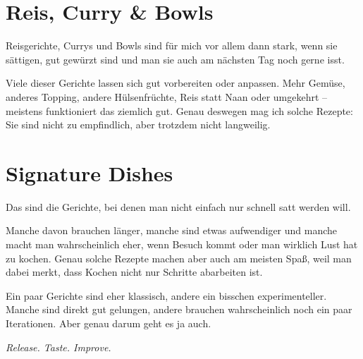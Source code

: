 \documentclass[
a4paper,
11pt
]{article}
\begin{document}

\section{Reis, Curry \& Bowls}

Reisgerichte, Currys und Bowls sind für mich vor allem dann stark, wenn sie sättigen, gut gewürzt sind und man sie auch am nächsten Tag noch gerne isst.

Viele dieser Gerichte lassen sich gut vorbereiten oder anpassen. Mehr Gemüse, anderes Topping, andere Hülsenfrüchte, Reis statt Naan oder umgekehrt -- meistens funktioniert das ziemlich gut. Genau deswegen mag ich solche Rezepte: Sie sind nicht zu empfindlich, aber trotzdem nicht langweilig.

\mylocaltableofcontents%
\newpage







\section{Signature Dishes}

Das sind die Gerichte, bei denen man nicht einfach nur schnell satt werden will.

Manche davon brauchen länger, manche sind etwas aufwendiger und manche macht man wahrscheinlich eher, wenn Besuch kommt oder man wirklich Lust hat zu kochen. Genau solche Rezepte machen aber auch am meisten Spaß, weil man dabei merkt, dass Kochen nicht nur Schritte abarbeiten ist.

Ein paar Gerichte sind eher klassisch, andere ein bisschen experimenteller. Manche sind direkt gut gelungen, andere brauchen wahrscheinlich noch ein paar Iterationen. Aber genau darum geht es ja auch.

\textit{Release. Taste. Improve.}

\mylocaltableofcontents%
\newpage








\end{document}
